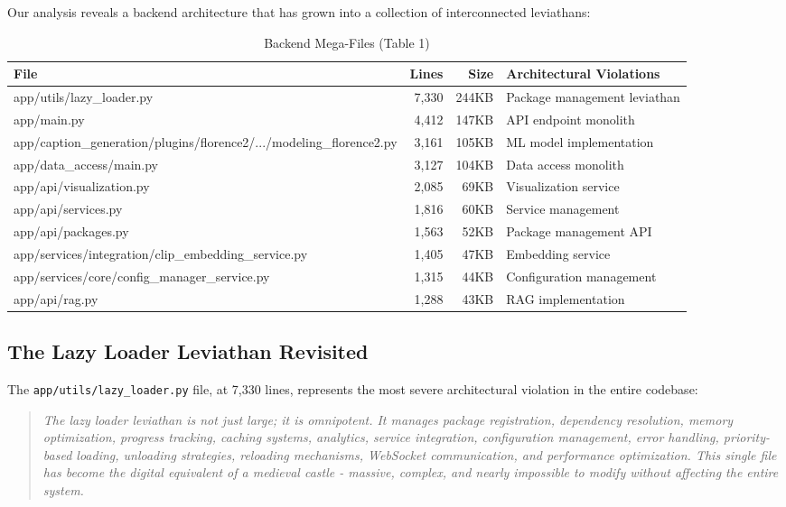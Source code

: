 \documentclass[11pt]{article}
\begin{document}
Our analysis reveals a backend architecture that has grown into a collection of interconnected leviathans:

\begin{table}[ht]
\centering
\begin{tabular}{|p{3.5cm}|r|r|p{4cm}|}
\hline
\textbf{File} & \textbf{Lines} & \textbf{Size} & \textbf{Architectural Violations} \\
\hline
app/utils/lazy\_loader.py & 7,330 & 244KB & Package management leviathan \\
app/main.py & 4,412 & 147KB & API endpoint monolith \\
app/caption\_generation/plugins/florence2/.../modeling\_florence2.py & 3,161 & 105KB & ML model implementation \\
app/data\_access/main.py & 3,127 & 104KB & Data access monolith \\
app/api/visualization.py & 2,085 & 69KB & Visualization service \\
app/api/services.py & 1,816 & 60KB & Service management \\
app/api/packages.py & 1,563 & 52KB & Package management API \\
app/services/integration/clip\_embedding\_service.py & 1,405 & 47KB & Embedding service \\
app/services/core/config\_manager\_service.py & 1,315 & 44KB & Configuration management \\
app/api/rag.py & 1,288 & 43KB & RAG implementation \\
\hline
\end{tabular}
\caption{Backend Mega-Files (Table 1)}
\end{table}

\subsection{The Lazy Loader Leviathan Revisited}

The \texttt{app/utils/lazy\_loader.py} file, at 7,330 lines, represents the most severe architectural violation in the entire codebase:

\begin{quote}
\emph{The lazy loader leviathan is not just large; it is omnipotent. It manages package registration, dependency resolution, memory optimization, progress tracking, caching systems, analytics, service integration, configuration management, error handling, priority-based loading, unloading strategies, reloading mechanisms, WebSocket communication, and performance optimization. This single file has become the digital equivalent of a medieval castle - massive, complex, and nearly impossible to modify without affecting the entire system.}
\end{quote}
\end{document}
